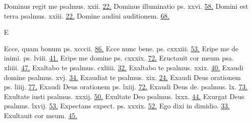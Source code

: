\documentclass[a5paper,10pt]{book}
\begin{document}
\begin{multicols}{2}
\newline Dominus regit me psalmus. xxii. \hfill \hyperlink{ps22}{22.}
\newline Dominus illuminatio ps. xxvi. \hfill \hyperlink{ps26}{58.}
\newline Domini est terra psalmus. xxiii. \hfill \hyperlink{ps23}{22.}
\newline Domine audiui auditionem. \hfill \hyperlink{Habakkuk}{68.}
\newline \vspace{-1.75em}
\begin{center}
\color{red} E
\end{center}
\vspace{-.75em}
\par \noindent Ecce, quam bonum ps. xcccii. \hfill \hyperlink{ps132}{86.}
\newline Ecce nunc bene. ps. cxxxiii. \hfill \hyperlink{ps133}{53.}
\newline Eripe me de inimi. ps. lviii. \hfill \hyperlink{ps58}{41.}
\newline Eripe me domine ps. cxxxix. \hfill \hyperlink{ps139}{72.}
\newline Eructauit cor meum psa. xliiii. \hfill \hyperlink{ps44}{47.}
\newline Exaltabo te psalmus. cxliiii. \hfill \hyperlink{ps144}{32.}
\newline Exaltabo te psalmus. xxix. \hfill \hyperlink{ps29}{40.}
\newline Exaudi domine psalmus. xvj. \hfill \hyperlink{ps16}{34.}
\newline Exaudiat te psalmus. xix. \hfill \hyperlink{ps19}{24.}
\newline Exaudi Deus orationem ps. liiij. \hfill \hyperlink{ps54}{77.}
\newline Exaudi Deus orationem ps. lxiij. \hfill \hyperlink{ps63}{72.}
\newline Exaudi Deus de. psalmus. lx. \hfill \hyperlink{ps60}{73.}
\newline Exultate iusti psalmus. xxxij. \hfill \hyperlink{ps32}{50.}
\newline Exultate Deo psalmus. lxxx. \hfill \hyperlink{ps80}{44.}
\newline Exurgat Deus psalmus. lxvij. \hfill \hyperlink{ps67}{53.}
\newline Expectans expect. ps. xxxix. \hfill \hyperlink{ps39}{52.}
\newline Ego dixi in dimidio. \hfill \hyperlink{Ezekiel}{33.}
\newline Exultauit cor meum. \hfill \hyperlink{Anna}{45.}

\end{multicols}
\end{document}
